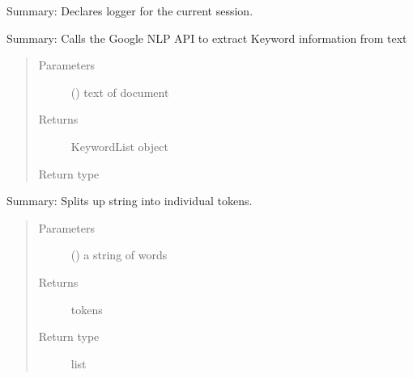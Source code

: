 \documentclass[letterpaper,10pt,english]{sphinxmanual}
\begin{document}

\begin{fulllineitems}
\label{\detokenize{functionsv1:analyze_functions.declarelogger}}
Summary: Declares logger for the current session.

\end{fulllineitems}


\begin{fulllineitems}
\label{\detokenize{functionsv1:analyze_functions.identifykeywords}}
Summary: Calls the Google NLP API to extract Keyword information from text
\begin{quote}\begin{description}
\item[{Parameters}] \leavevmode
{} () \textendash{} text of document

\item[{Returns}] \leavevmode
KeywordList object

\item[{Return type}] \leavevmode
{\hyperref[\detokenize{KeywordList:module-KeywordList}]{}}

\end{description}\end{quote}

\end{fulllineitems}


\begin{fulllineitems}
\label{\detokenize{functionsv1:analyze_functions.tokenize}}
Summary: Splits up string into individual tokens.
\begin{quote}\begin{description}
\item[{Parameters}] \leavevmode
{} () \textendash{} a string of words

\item[{Returns}] \leavevmode
tokens

\item[{Return type}] \leavevmode
list

\end{description}\end{quote}

\end{fulllineitems}
\end{document}
